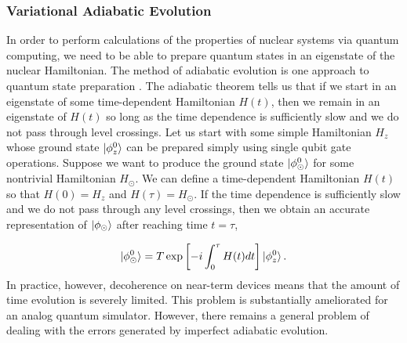 \documentclass[10pt]{article}
\begin{document}
\subsubsection{Variational Adiabatic Evolution}

In order to perform calculations of the properties of nuclear systems
via quantum computing, we need to be able to prepare quantum states in
an eigenstate of the nuclear Hamiltonian. The method of adiabatic
evolution is one approach to quantum state preparation
\cite{Farhi:2000a}.  The adiabatic theorem tells us that if we start
in an eigenstate of some time-dependent Hamiltonian $H(t)$, then we
remain in an eigenstate of $H(t)$ so long as the time dependence is
sufficiently slow and we do not pass through level crossings.  Let us
start with some simple Hamiltonian $H_z$ whose ground state
$\ket{\phi^0_z}$ can be prepared simply using single qubit gate
operations. Suppose we want to produce the ground state
$\ket{\phi^{0}_\odot}$ for some nontrivial Hamiltonian $H_\odot$.  We
can define a time-dependent Hamiltonian $H(t)$ so that $H(0)=H_z$ and
$H(\tau)=H_\odot$.  If the time dependence is sufficiently slow and we
do not pass through any level crossings, then we obtain an accurate
representation of $\ket{\phi_\odot}$ after reaching time $t = \tau$,

\begin{equation}
\ket{\phi_\odot^0} = T \exp\left[-i\int_0^\tau H(t) dt \right]\ket{\phi_z^{0}}.
\end{equation}  
In practice, however, decoherence on near-term devices means that the
amount of time evolution is severely limited.  This problem is
substantially ameliorated for an analog quantum simulator.  However,
there remains a general problem of dealing with the errors generated
by imperfect adiabatic evolution.
\end{document}
